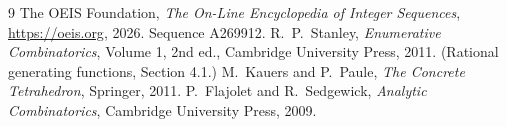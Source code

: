 \documentclass[11pt,a4paper]{article}
\theoremstyle{plain}
\theoremstyle{definition}
\begin{document}
\begin{thebibliography}{9}
 The OEIS Foundation, \emph{The On-Line Encyclopedia of Integer
Sequences}, \url{https://oeis.org}, 2026. Sequence A269912.
 R.~P.~Stanley, \emph{Enumerative Combinatorics}, Volume 1, 2nd ed.,
Cambridge University Press, 2011. (Rational generating functions, Section 4.1.)
 M.~Kauers and P.~Paule, \emph{The Concrete Tetrahedron}, Springer, 2011.
 P.~Flajolet and R.~Sedgewick, \emph{Analytic Combinatorics}, Cambridge
University Press, 2009.
\end{thebibliography}
\end{document}
